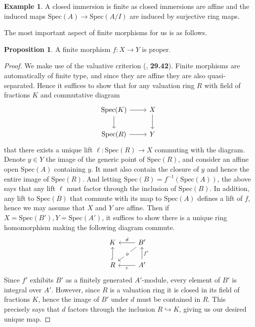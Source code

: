 \documentclass{article}
\theoremstyle{definition}
\newtheorem{proposition}[theorem]{Proposition}
\newtheorem{example}[theorem]{Example}
\theoremstyle{remark}
\begin{document}
\begin{example}
	A closed immersion is finite as closed immersions are affine and the induced maps $\text{Spec}(A) \to \text{Spec}(A/I)$ are induced by surjective ring maps.
\end{example}

The most important aspect of finite morphisms for us is as follows.
\begin{proposition}
	A finite morphism $f: X \to Y$ is proper. 
\end{proposition}
\begin{proof}
	We make use of the valuative criterion (\cite{stacks-project}, \textbf{29.42}).
	Finite morphisms are automatically of finite type, and since they are affine they are also quasi-separated.
	Hence it suffices to show that for any valuation ring $R$ with field of fractions $K$ and commutative diagram
\[\begin{tikzcd}
	{\text{Spec}(K)} & X \\
	{\text{Spec}(R)} & Y
	\arrow[from=1-1, to=1-2]
	\arrow[from=1-1, to=2-1]
	\arrow[from=1-2, to=2-2]
	\arrow[from=2-1, to=2-2]
\end{tikzcd}\]
that there exists a unique lift $\ell: \text{Spec}(R) \to X$ commuting with the diagram.
Denote $y \in Y$ the image of the generic point of $\text{Spec}(R)$, and consider an affine open $\text{Spec}(A)$ containing $y$.
It must also contain the closure of $y$ and hence the entire image of $\text{Spec}(R)$.
And letting $\text{Spec}(B) = f^{-1}(\text{Spec}(A))$, the above says that any lift $\ell$ must factor through the inclusion of $\text{Spec}(B)$.
In addition, any lift to $\text{Spec}(B)$ that commute with its map to $\text{Spec}(A)$ defines a lift of $f$, hence we may assume that $X$ and $Y$ are affine.
Then if $X = \text{Spec}(B'), Y = \text{Spec}(A')$, it suffices to show there is a unique ring homomorphism making the following diagram commute.
\[\begin{tikzcd}
	K & {B'} \\
	R & {A'}
	\arrow["d"', from=1-2, to=1-1]
	\arrow["\phi"{description}, from=1-2, to=2-1]
	\arrow[hook, from=2-1, to=1-1]
	\arrow["{f'}"', from=2-2, to=1-2]
	\arrow["c", from=2-2, to=2-1]
\end{tikzcd}\]
Since $f'$ exhibits $B'$ as a finitely generated $A'$-module, every element of $B'$ is integral over $A'$.
However, since $R$ is a valuation ring it is closed in its field of fractions $K$, hence the image of $B'$ under $d$ must be contained in $R$.
This precisely says that $d$ factors through the inclusion $R \hookrightarrow K$, giving us our desired unique map.
\end{proof}
\end{document}
